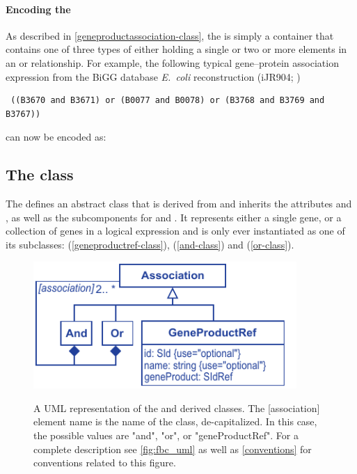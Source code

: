 \paragraph{Encoding the \GeneProductAssociation}
As described in \ref{geneproductassociation-class}, the \GeneProductAssociation
is simply a container that contains one of three types of \Association either
holding a single \GeneProductRef or two or more \Association elements in an
\GeneAnd or \GeneOr relationship. For example, the following typical
gene--protein association expression from the BiGG database \emph{E.~coli}
reconstruction (iJR904; \citealt{ijr904, bigg})
%
\begin{verbatim}
 ((B3670 and B3671) or (B0077 and B0078) or (B3768 and B3769 and B3767))
\end{verbatim}
%
can now be encoded as:
%
\pagebreak
\subsection{The \FBC {} class}
\label{association-class}

The \FBCPackage defines an abstract \Association class that is
derived from \SBase and inherits the attributes  and
, as well as the subcomponents for \Annotation and \Notes.
It represents either a single gene, or a collection of genes in a
logical expression and is only ever instantiated as one of its
subclasses: \GeneProductRef (\ref{geneproductref-class}), \GeneAnd
(\ref{and-class}) and \GeneOr (\ref{or-class}).
%
\begin{figure}[ht!]
  \centering
  \includegraphics[width=10cm]{images/v2harmony_fbc_association.pdf}\\
  \caption{A UML representation of the \FBCPackage \Association and derived
	classes. The [association] element name is the name of the class, de-capitalized. In this case, the possible values are "and", "or", or "geneProductRef". For a complete description see \ref{fig:fbc_uml} as well as \ref{conventions} for conventions related to this figure.}
  \label{fig:fbc_uml_ass}
\end{figure}


